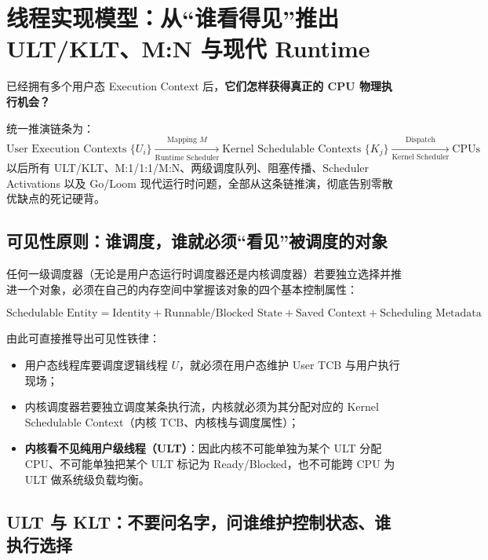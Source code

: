 \documentclass[11pt,a4paper]{ctexart}
\newcommand{\kw}[1]{\textbf{#1}}
\begin{document}
\section{线程实现模型：从“谁看得见”推出 ULT/KLT、M:N 与现代 Runtime}

\begin{corebox}[这一节只解决一个母问题]
已经拥有多个用户态 Execution Context 后，\kw{它们怎样获得真正的 CPU 物理执行机会？}

统一推演链条为：
\[
\boxed{
\text{User Execution Contexts } \{U_i\}
\xrightarrow[\text{Runtime Scheduler}]{\text{Mapping } M}
\text{Kernel Schedulable Contexts } \{K_j\}
\xrightarrow[\text{Kernel Scheduler}]{\text{Dispatch}}
\text{CPUs}
}
\]
以后所有 ULT/KLT、M:1/1:1/M:N、两级调度队列、阻塞传播、Scheduler Activations 以及 Go/Loom 现代运行时问题，全部从这条链推演，彻底告别零散优缺点的死记硬背。
\end{corebox}

\subsection{可见性原则：谁调度，谁就必须“看见”被调度的对象}

任何一级调度器（无论是用户态运行时调度器还是内核调度器）若要独立选择并推进一个对象，必须在自己的内存空间中掌握该对象的四个基本控制属性：

\[
\boxed{
\text{Schedulable Entity} = \text{Identity} + \text{Runnable/Blocked State} + \text{Saved Context} + \text{Scheduling Metadata}
}
\]

由此可直接推导出可见性铁律：
\begin{itemize}
\item 用户态线程库要调度逻辑线程 $U$，就必须在用户态维护 User TCB 与用户执行现场；
\item 内核调度器若要独立调度某条执行流，内核就必须为其分配对应的 Kernel Schedulable Context（内核 TCB、内核栈与调度属性）；
\item \kw{内核看不见纯用户级线程（ULT）}：因此内核不可能单独为某个 ULT 分配 CPU、不可能单独把某个 ULT 标记为 Ready/Blocked，也不可能跨 CPU 为 ULT 做系统级负载均衡。
\end{itemize}

\subsection{ULT 与 KLT：不要问名字，问谁维护控制状态、谁执行选择}
\end{document}
